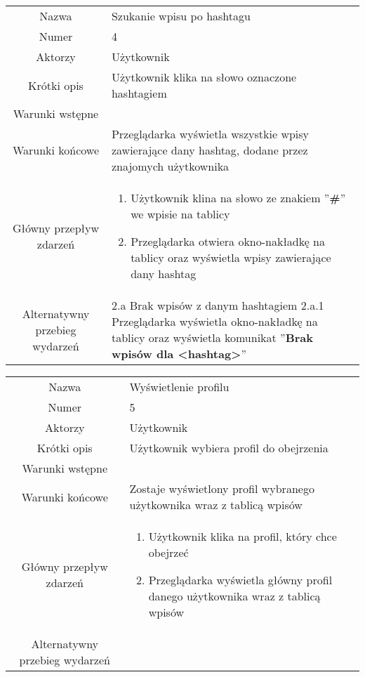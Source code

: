 \documentclass[a4paper]{article}
\begin{document}
\begin{tabular}{c p{10cm}}
Nazwa&	Szukanie wpisu po hashtagu\\
Numer	& 4\\
Aktorzy &	Użytkownik\\
Krótki opis &  Użytkownik klika na słowo oznaczone hashtagiem\\
Warunki wstępne& \\
Warunki końcowe& Przeglądarka wyświetla wszystkie wpisy zawierające dany hashtag, dodane przez znajomych użytkownika\\
Główny przepływ zdarzeń&
\begin{enumerate}
\item Użytkownik klina na słowo ze znakiem ''\textbf{\#}'' we wpisie na tablicy
\item Przeglądarka otwiera okno-nakładkę na tablicy oraz wyświetla wpisy zawierające dany hashtag
\end{enumerate} \\

Alternatywny przebieg wydarzeń &
2.a Brak wpisów z danym hashtagiem \newline
2.a.1 Przeglądarka wyświetla okno-nakładkę na tablicy oraz wyświetla komunikat ''\textbf{Brak wpisów dla <hashtag>}'' \newline \\
\hline
\end{tabular}
\newline
\newline
\begin{tabular}{c p{10cm}}
Nazwa&	Wyświetlenie profilu\\
Numer	& 5\\
Aktorzy &	Użytkownik\\
Krótki opis &  Użytkownik wybiera profil do obejrzenia\\
Warunki wstępne& \\
Warunki końcowe& Zostaje wyświetlony profil wybranego użytkownika wraz z tablicą wpisów\\
Główny przepływ zdarzeń&
\begin{enumerate}
\item Użytkownik klika na profil, który chce obejrzeć 
\item Przeglądarka wyświetla główny profil danego użytkownika wraz z tablicą wpisów
\end{enumerate} \\

Alternatywny przebieg wydarzeń & \\
\hline
\end{tabular}
\end{document}
